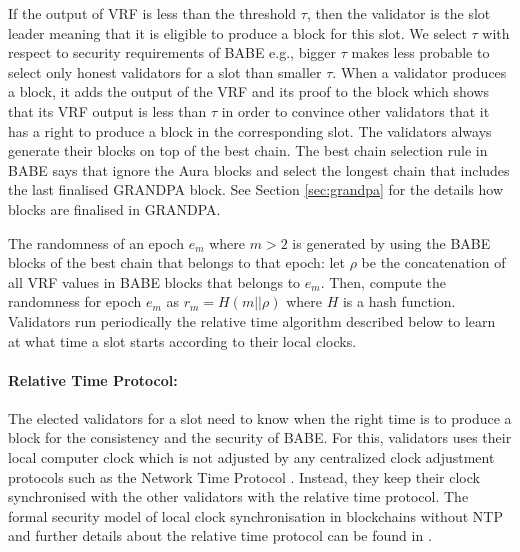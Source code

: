 \documentclass{article}
\begin{document}
If the output of  VRF is less than the threshold $ \tau $, then the validator is the slot leader meaning that it is eligible to produce a block for this slot. We select $\tau$ with respect to security requirements of BABE \cite{babe} e.g., bigger $ \tau $ makes less probable to select only honest validators for a slot than smaller $ \tau $. 
When a validator produces a block, it adds the output of the VRF and its proof to the block which shows that its VRF output is less than $\tau$  in order to convince other validators that it has a right to produce a block in the corresponding slot. The validators always generate their blocks on top of the best chain.
The best chain selection rule in BABE says that ignore the Aura blocks and select the longest chain that includes the last finalised GRANDPA block. See Section \ref{sec:grandpa} for the details how blocks are finalised in GRANDPA.

The randomness of an epoch $e_m$ where $ m > 2 $ is generated by using the BABE blocks of the best chain that belongs to that epoch: let \(\rho\) be the concatenation of all  VRF values in BABE blocks that belongs to $e_m$. Then, compute the randomness for epoch $ e_m $ as $r_{m} = H(m
||\rho)$ where $ H $ is a hash function. Validators run periodically the relative time algorithm described below to learn at what time a slot starts according to their local clocks.




\paragraph{Relative Time Protocol:}

The elected validators for a slot need to know when the right time is to produce a block for the consistency and the security of BABE. For this, validators uses their local computer clock which is not adjusted by  any centralized clock adjustment protocols such as the Network Time Protocol \cite{ntp}. Instead, they keep their clock synchronised with the other validators with the relative time protocol. 
The formal security model of local clock synchronisation in blockchains without NTP and further details about the relative time protocol can be found in \cite{consensusonclock}.
\end{document}
